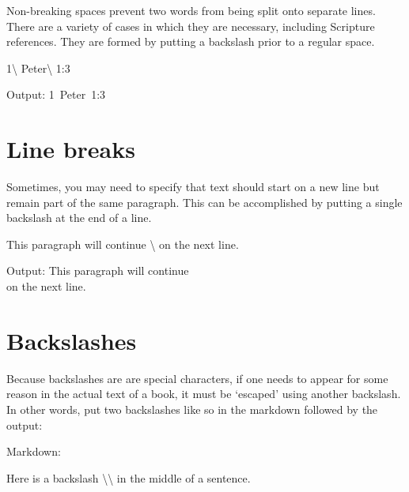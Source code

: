 \documentclass[
]{book}
\newenvironment{Shaded}{\begin{snugshade}}{\end{snugshade}}
\newcommand{\NormalTok}[1]{#1}
\newcommand{\SpecialCharTok}[1]{\textcolor[rgb]{0.00,0.00,0.00}{#1}}
\begin{document}
Non-breaking spaces prevent two words from being split onto separate lines. There are a variety of cases in which they are necessary, including Scripture references. They are formed by putting a backslash prior to a regular space.

\begin{Shaded}
\begin{Highlighting}[]
\NormalTok{1\textbackslash{} Peter\textbackslash{} 1:3 }
\end{Highlighting}
\end{Shaded}

Output: 1~Peter~1:3

\hypertarget{line-breaks}{%
\section{Line breaks}\label{line-breaks}}

Sometimes, you may need to specify that text should start on a new line but remain part of the same paragraph. This can be accomplished by putting a single backslash at the end of a line.

\begin{Shaded}
\begin{Highlighting}[]
\NormalTok{This paragraph will continue \textbackslash{}}
\NormalTok{on the next line.}
\end{Highlighting}
\end{Shaded}

Output: This paragraph will continue\\
on the next line.

\hypertarget{backslashes}{%
\section{Backslashes}\label{backslashes}}

Because backslashes are are special characters, if one needs to appear for some reason in the actual text of a book, it must be `escaped' using another backslash. In other words, put two backslashes like so in the markdown followed by the output:

Markdown:

\begin{Shaded}
\begin{Highlighting}[]
\NormalTok{Here is a backslash }\SpecialCharTok{\textbackslash{}\textbackslash{}}\NormalTok{ in the middle of a sentence. }
\end{Highlighting}
\end{Shaded}
\end{document}
